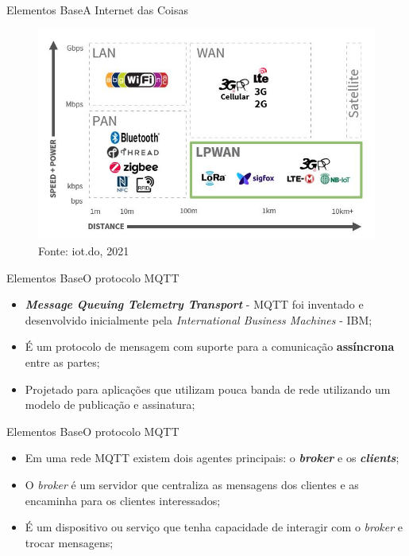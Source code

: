 \begin{frame}{Elementos Base}{A Internet das Coisas}

    \begin{figure}
        \centering
        \caption{Protocolos utilizados para aplicacão do \textit{IoT} com base nos conceitos de redes. Relação entre velocidade-força e distância.}
        \includegraphics[width=0.6\linewidth]{figuras/iotprotocols.jpg}
        \caption*{\tiny{Fonte: iot.do, 2021}}
    \end{figure}   

\end{frame}


\begin{frame}{Elementos Base}{O protocolo MQTT}

    \begin{itemize}
        \item \textbf{\textit{Message Queuing Telemetry Transport}} - MQTT foi inventado e desenvolvido inicialmente pela \textit{International Business Machines} - IBM;
        \item É um protocolo de mensagem com suporte para a comunicação \textbf{assíncrona} entre as partes;
        \item Projetado para aplicações que utilizam pouca banda de rede utilizando um modelo de publicação e assinatura;

    \end{itemize}


\end{frame}

\begin{frame}{Elementos Base}{O protocolo MQTT}

    \begin{itemize}
        \item Em uma rede MQTT existem dois agentes principais: o \textit{\textbf{broker}} e os \textit{\textbf{clients}};
        \item O \textit{broker} é um servidor que centraliza as mensagens dos clientes e as encaminha para os clientes interessados;
        \item É um dispositivo ou serviço que tenha capacidade de interagir com o \textit{broker} e trocar mensagens;

    \end{itemize}


\end{frame}

